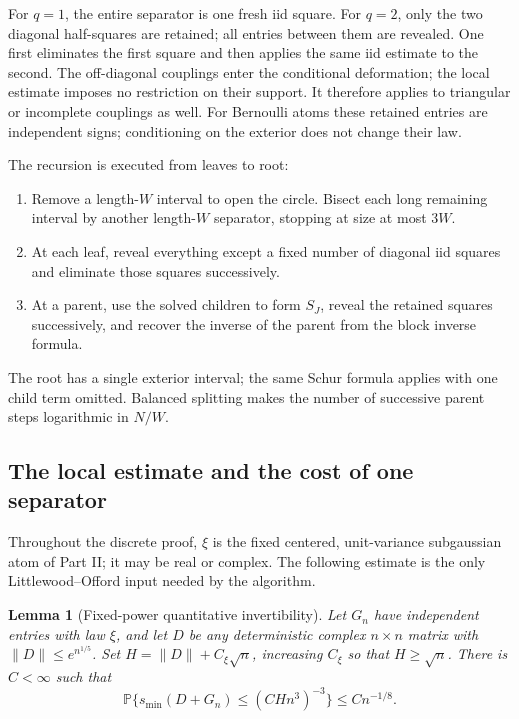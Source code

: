 \documentclass[11pt,reqno]{amsart}
\numberwithin{equation}{section}
\theoremstyle{plain}
\newtheorem{lemma}[theorem]{Lemma}
\theoremstyle{definition}
\theoremstyle{remark}
\providecommand{\blsvP}{\mathbb P}
\providecommand{\blsvsmin}{s_{\min}}
\begin{document}
For $q=1$, the entire separator is one fresh iid square. For $q=2$,
only the two diagonal half-squares are retained; all entries between
them are revealed. One first eliminates the first square and then
applies the same iid estimate to the second. The off-diagonal couplings
enter the conditional deformation; the local estimate imposes no
restriction on their support. It therefore applies to triangular or
incomplete couplings as well.
For Bernoulli atoms these retained entries are independent signs;
conditioning on the exterior does not change their law.

The recursion is executed from leaves to root:
\begin{enumerate}[label=\textup{\arabic*.}]
\item Remove a length-$W$ interval to open the circle. Bisect each long
remaining interval by another length-$W$ separator, stopping at size
at most $3W$.
\item At each leaf, reveal everything except a fixed number of diagonal
iid squares and eliminate those squares successively.
\item At a parent, use the solved children to form $S_J$, reveal the
retained squares successively, and recover the inverse of the parent
from the block inverse formula.
\end{enumerate}
The root has a single exterior interval; the same Schur formula applies
with one child term omitted. Balanced splitting makes the number of
successive parent steps logarithmic in $N/W$.

\subsection{The local estimate and the cost of one separator}
Throughout the discrete proof, $\xi$ is the fixed centered, unit-variance
subgaussian atom of Part II; it may be real or complex. The following
estimate is the only Littlewood--Offord input needed by the algorithm.
\begin{lemma}[Fixed-power quantitative invertibility]\label{blsv:lem-local}
Let $G_n$ have independent entries with law $\xi$, and let $D$ be any
deterministic complex $n\times n$ matrix with $\|D\|\le e^{n^{1/5}}$.
Set $H=\|D\|+C_\xi\sqrt n$, increasing $C_\xi$ so that $H\ge\sqrt n$.
There is $C<\infty$ such that
\begin{equation}\label{blsv:eq-local-result}
 \blsvP\{\blsvsmin(D+G_n)\le(CHn^3)^{-3}\}\le C n^{-1/8}.
\end{equation}
\end{lemma}
\end{document}
